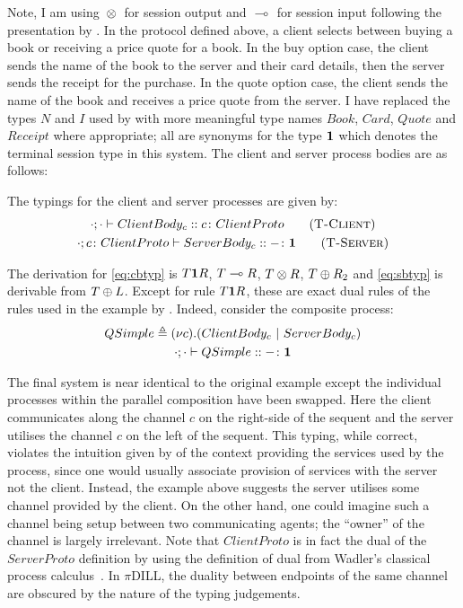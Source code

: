 Note, I am using ${}\otimes{}$ for session output and ${}\multimap{}$ for session
input following the presentation by \citeauthor{Caires:2010:STI}. In the
protocol defined above, a client selects between buying a book or receiving a
price quote for a book. In the buy option case, the client sends the name of
the book to the server and their card details, then the server sends the
receipt for the purchase. In the quote option case, the client sends the name
of the book and receives a price quote from the server. I have replaced the
types $N$ and $I$ used by \citeauthor{Caires:2010:STI} with more meaningful
type names $Book$, $Card$, $Quote$ and $Receipt$ where appropriate; all are
synonyms for the type $\mathbf{1}$ which denotes the terminal session type in this
system. The client and server process bodies are as follows:


\begin{samepage}
The typings for the client and server processes are given by:
\begin{gather*}
\tsequent{\cdot}{\cdot}{ClientBody_c}{\typedid{c}{ClientProto}}
\tag{\mkTrule{Client}} \label{eq:cbtyp}
\\ \tsequent{\cdot}{\typedid{c}{ClientProto}}{ServerBody_c}{\typedid{-}{\1}}
\tag{\mkTrule{Server}} \label{eq:sbtyp}
\end{gather*}
\end{samepage}

The derivation for \eqref{eq:cbtyp} is $T\mathbf{1} R$, ${T}\multimap{R}$, ${T}\otimes{R}$,
${T}\oplus{R_2}$ and \eqref{eq:sbtyp} is derivable from
${T}\oplus{L}$. Except for rule $T\mathbf{1} R$, these are exact dual rules of the
rules used in the example by \citeauthor{Caires:2010:STI}. Indeed, consider
the composite process:
\begin{gather*}
{QSimple}\triangleq{(\nu{c}).({ClientBody_c}~|~{ServerBody_c})}\\
{\cdot};{\cdot}\vdash{QSimple}::{{-}\colon{\mathbf{1}}}
\end{gather*}

The final system is near identical to the original example except the
individual processes within the parallel composition have been swapped. Here
the client communicates along the channel $c$ on the right-side of the sequent
and the server utilises the channel $c$ on the left of the sequent. This
typing, while correct, violates the intuition given by
\citeauthor{Caires:2010:STI} of the context providing the services used by the
process, since one would usually associate provision of services with the
server not the client. Instead, the example above suggests the server utilises
some channel provided by the client. On the other hand, one could imagine such
a channel being setup between two communicating agents; the ``owner'' of the
channel is largely irrelevant. Note that $ClientProto$ is in fact the dual of
the $ServerProto$ definition by \citeauthor{Caires:2010:STI} using the
definition of dual from Wadler's classical process
calculus~\cite{Wadler:2014}. In $\pi$DILL, the duality between endpoints of
the same channel are obscured by the nature of the typing judgements.

